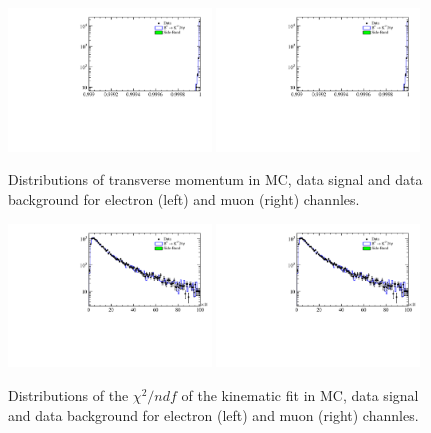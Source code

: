 \begin{figure}[h!]
\centering
\includegraphics[width=0.48\textwidth]{RKst/figs/MC_data_comp/EE/drawVariables_B0_DIRA_OWNPV.pdf}
\includegraphics[width=0.48\textwidth]{RKst/figs/MC_data_comp/MM/drawVariables_B0_DIRA_OWNPV.pdf}
\caption{ Distributions of \Bz transverse momentum in MC, data signal and data background for electron (left) and muon (right) channles.   }
\end{figure}

\begin{figure}[h!]
\centering
\includegraphics[width=0.48\textwidth]{RKst/figs/MC_data_comp/EE/drawVariables_B0_FDCHI2_OWNPV.pdf}
\includegraphics[width=0.48\textwidth]{RKst/figs/MC_data_comp/MM/drawVariables_B0_FDCHI2_OWNPV.pdf}
\caption{ Distributions of the $\chi^2/ndf$ of the kinematic fit in MC, data signal and data background for electron (left) and muon (right) channles.   }
\end{figure}


